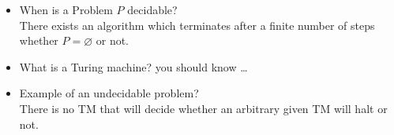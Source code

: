 \documentclass[a4paper, 10pt]{article}
\begin{document}
\begin{itemize}
\begin{itemize}
\[\begin{array}{cccc}
         c_N & & & \epsilon
        \end{array}
        \right)
        \] so that for all $i,j:c_{ij}\in A_{ij}^*$
        \item we call $(S,C)$ a \emph{global system state}
        \item \textbf{State Transition Relation} let $P$ a protocol and $G=\{(S,C) | (S,C) \textrm{ is a global system state}\}$
    \\
    $\vdash: \; G \to G$ is defined as follows \\
    $(S,C) \vdash (S',C') \; iff \; \exists\; i,k,x_{ik}$ such that either
    \begin{enumerate}
        \item $(S,C)$ and $(S',C')$ are identical except for the following exceptions
        \[ s_i'=\delta(s_i.!x_{ik}) \textrm{ (\blue{sending by i})} \]
        \[ \blue{c'_{ik} =c_{ik}x_{ik} } \]
        \item $(S,C)$ and $(S',C')$ are identical except for the following exceptions
        \[ s'_k = \delta(s_k,?x_{ik}) \textrm{ (\dGreen{receiving by k}) } \]
        \[\dGreen{c_{ik} = x_{ik}c'_{ik}} \]
    \end{enumerate}
    \item Reachable Global System State, Paths and Acceptance
    \begin{itemize}
        \item $G^0$ the initial global system state of a protocol
        \item $G$ a global system state of the same protocol
        \item $\vdash$ the state transition relation of this same protocol
        \item $\vdash^*$ denotes the transitive closure of $\vdash$
    \end{itemize}
    \item we say that $G$ is reachable if \[ G^0 \vdash^* G \]
    \end{itemize}
    \item When is a Problem $P$ decidable? \\
    There exists an algorithm which terminates after a finite number of steps whether $P=\varnothing$ or not.
    \item What is a Turing machine? {\tiny you should know \dots}
    \item Example of an undecidable problem?
    \\ There is no TM that will decide whether an arbitrary given TM will halt or not.

\end{itemize}
\end{document}

